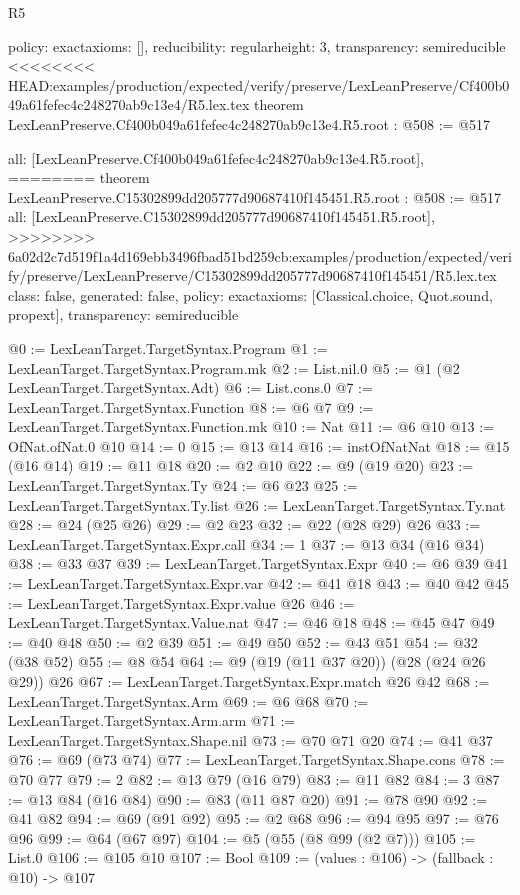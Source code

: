 \begin{lexlean}{R5}
\begin{coremodule}
{{{{{{{  policy: exact{axioms: []},
  reducibility: regular{height: 3},
  transparency: semireducible
}
<<<<<<<< HEAD:examples/production/expected/verify/preserve/LexLeanPreserve/Cf400b049a61fefec4c248270ab9c13e4/R5.lex.tex
theorem LexLeanPreserve.Cf400b049a61fefec4c248270ab9c13e4.R5.root : @508 := @517 {
  all: [LexLeanPreserve.Cf400b049a61fefec4c248270ab9c13e4.R5.root],
========
theorem LexLeanPreserve.C15302899dd205777d90687410f145451.R5.root : @508 := @517 {
  all: [LexLeanPreserve.C15302899dd205777d90687410f145451.R5.root],
>>>>>>>> 6a02d2c7d519f1a4d169ebb3496fbad51bd259cb:examples/production/expected/verify/preserve/LexLeanPreserve/C15302899dd205777d90687410f145451/R5.lex.tex
  class: false,
  generated: false,
  policy: exact{axioms: [Classical.choice, Quot.sound, propext]},
  transparency: semireducible
}

@0 := LexLeanTarget.TargetSyntax.Program
@1 := LexLeanTarget.TargetSyntax.Program.mk
@2 := List.nil.{0}
@5 := @1 (@2 LexLeanTarget.TargetSyntax.Adt)
@6 := List.cons.{0}
@7 := LexLeanTarget.TargetSyntax.Function
@8 := @6 @7
@9 := LexLeanTarget.TargetSyntax.Function.mk
@10 := Nat
@11 := @6 @10
@13 := OfNat.ofNat.{0} @10
@14 := 0
@15 := @13 @14
@16 := instOfNatNat
@18 := @15 (@16 @14)
@19 := @11 @18
@20 := @2 @10
@22 := @9 (@19 @20)
@23 := LexLeanTarget.TargetSyntax.Ty
@24 := @6 @23
@25 := LexLeanTarget.TargetSyntax.Ty.list
@26 := LexLeanTarget.TargetSyntax.Ty.nat
@28 := @24 (@25 @26)
@29 := @2 @23
@32 := @22 (@28 @29) @26
@33 := LexLeanTarget.TargetSyntax.Expr.call
@34 := 1
@37 := @13 @34 (@16 @34)
@38 := @33 @37
@39 := LexLeanTarget.TargetSyntax.Expr
@40 := @6 @39
@41 := LexLeanTarget.TargetSyntax.Expr.var
@42 := @41 @18
@43 := @40 @42
@45 := LexLeanTarget.TargetSyntax.Expr.value @26
@46 := LexLeanTarget.TargetSyntax.Value.nat
@47 := @46 @18
@48 := @45 @47
@49 := @40 @48
@50 := @2 @39
@51 := @49 @50
@52 := @43 @51
@54 := @32 (@38 @52)
@55 := @8 @54
@64 := @9 (@19 (@11 @37 @20)) (@28 (@24 @26 @29)) @26
@67 := LexLeanTarget.TargetSyntax.Expr.match @26 @42
@68 := LexLeanTarget.TargetSyntax.Arm
@69 := @6 @68
@70 := LexLeanTarget.TargetSyntax.Arm.arm
@71 := LexLeanTarget.TargetSyntax.Shape.nil
@73 := @70 @71 @20
@74 := @41 @37
@76 := @69 (@73 @74)
@77 := LexLeanTarget.TargetSyntax.Shape.cons
@78 := @70 @77
@79 := 2
@82 := @13 @79 (@16 @79)
@83 := @11 @82
@84 := 3
@87 := @13 @84 (@16 @84)
@90 := @83 (@11 @87 @20)
@91 := @78 @90
@92 := @41 @82
@94 := @69 (@91 @92)
@95 := @2 @68
@96 := @94 @95
@97 := @76 @96
@99 := @64 (@67 @97)
@104 := @5 (@55 (@8 @99 (@2 @7)))
@105 := List.{0}
@106 := @105 @10
@107 := Bool
@109 := (values : @106) -> (fallback : @10) -> @107
}}}}}}}
\end{coremodule}
\end{lexlean}
